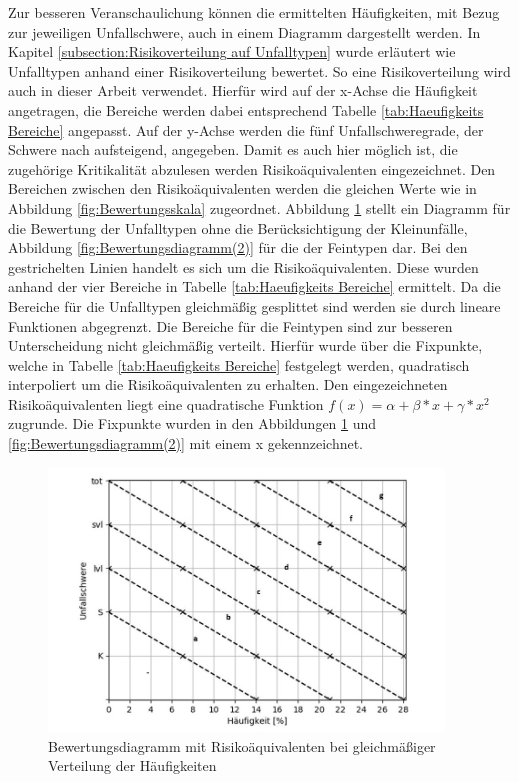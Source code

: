 Zur besseren Veranschaulichung können die ermittelten Häufigkeiten, mit Bezug zur jeweiligen Unfallschwere, auch in einem Diagramm dargestellt werden. In Kapitel \ref{subsection:Risikoverteilung auf Unfalltypen} wurde erläutert wie \Textcite[S. 60]{Gschwendtner.2015} Unfalltypen anhand einer Risikoverteilung bewertet. So eine Risikoverteilung wird auch in dieser Arbeit verwendet. Hierfür wird auf der x-Achse die Häufigkeit angetragen, die Bereiche werden dabei entsprechend Tabelle \ref{tab:Haeufigkeits Bereiche} angepasst. Auf der y-Achse werden die fünf Unfallschweregrade, der Schwere nach aufsteigend, angegeben. Damit es auch hier möglich ist, die zugehörige Kritikalität abzulesen werden Risikoäquivalenten eingezeichnet. Den Bereichen zwischen den Risikoäquivalenten werden die gleichen Werte wie in Abbildung \ref{fig:Bewertungsskala} zugeordnet. Abbildung \ref{fig:Bewertungsdiagramm} stellt ein Diagramm für die Bewertung der Unfalltypen ohne die Berücksichtigung der Kleinunfälle, Abbildung \ref{fig:Bewertungsdiagramm(2)} für die der Feintypen dar. Bei den gestrichelten Linien handelt es sich um die Risikoäquivalenten. Diese wurden anhand der vier Bereiche in Tabelle \ref{tab:Haeufigkeits Bereiche} ermittelt. Da die Bereiche für die Unfalltypen gleichmäßig gesplittet sind werden sie durch lineare Funktionen abgegrenzt. Die Bereiche für die Feintypen sind zur besseren Unterscheidung nicht gleichmäßig verteilt. Hierfür wurde über die Fixpunkte, welche in Tabelle \ref{tab:Haeufigkeits Bereiche} festgelegt werden, quadratisch interpoliert um die Risikoäquivalenten zu erhalten. Den eingezeichneten Risikoäquivalenten liegt eine quadratische Funktion $f(x) = \alpha + \beta*x + \gamma*x^{2}$ zugrunde. Die Fixpunkte wurden in den Abbildungen \ref{fig:Bewertungsdiagramm} und \ref{fig:Bewertungsdiagramm(2)} mit einem x gekennzeichnet. 

\begin{savenotes}
	\begin{figure}[H]
		\centering
		\includegraphics[width=10.5cm,height=7cm]{figures/Bewertungsdiagramm}
		\caption[Bewertungsdiagramm mit Risikoäquivalenten bei gleichmäßiger Verteilung der Häufigkeiten]{Bewertungsdiagramm mit Risikoäquivalenten bei gleichmäßiger Verteilung der Häufigkeiten}\label{fig:Bewertungsdiagramm}
	\end{figure}
\end{savenotes}

